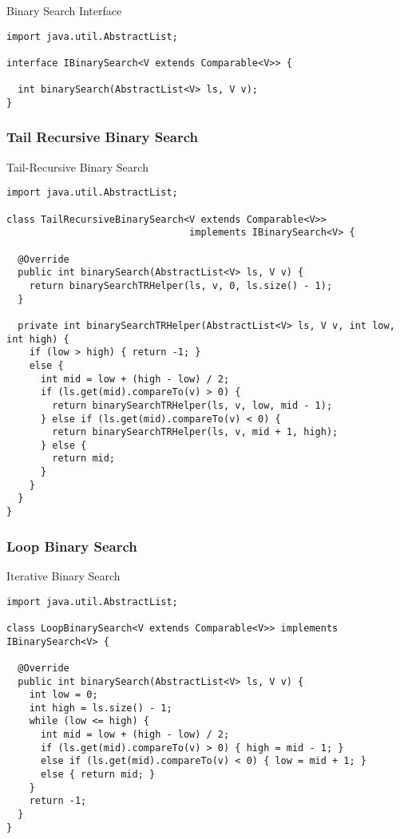 \begin{cl}{Binary Search Interface}
\begin{lstlisting}[language=MyJava]
import java.util.AbstractList;

interface IBinarySearch<V extends Comparable<V>> {
  
  int binarySearch(AbstractList<V> ls, V v);
}
\end{lstlisting}
\end{cl}

\subsubsection*{Tail Recursive Binary Search}

\begin{cl}{Tail-Recursive Binary Search}
\begin{lstlisting}[language=MyJava]
import java.util.AbstractList;

class TailRecursiveBinarySearch<V extends Comparable<V>> 
                                implements IBinarySearch<V> {

  @Override
  public int binarySearch(AbstractList<V> ls, V v) {
    return binarySearchTRHelper(ls, v, 0, ls.size() - 1);
  }

  private int binarySearchTRHelper(AbstractList<V> ls, V v, int low, int high) {
    if (low > high) { return -1; }
    else {
      int mid = low + (high - low) / 2;
      if (ls.get(mid).compareTo(v) > 0) { 
        return binarySearchTRHelper(ls, v, low, mid - 1); 
      } else if (ls.get(mid).compareTo(v) < 0) { 
        return binarySearchTRHelper(ls, v, mid + 1, high); 
      } else { 
        return mid; 
      }
    }
  }
}
\end{lstlisting}
\end{cl}

\subsubsection*{Loop Binary Search}

\begin{cl}{Iterative Binary Search}
\begin{lstlisting}[language=MyJava]
import java.util.AbstractList;
  
class LoopBinarySearch<V extends Comparable<V>> implements IBinarySearch<V> {
  
  @Override
  public int binarySearch(AbstractList<V> ls, V v) {
    int low = 0;
    int high = ls.size() - 1;
    while (low <= high) {
      int mid = low + (high - low) / 2;
      if (ls.get(mid).compareTo(v) > 0) { high = mid - 1; } 
      else if (ls.get(mid).compareTo(v) < 0) { low = mid + 1; } 
      else { return mid; }
    }
    return -1;
  }
}
\end{lstlisting}
\end{cl}

